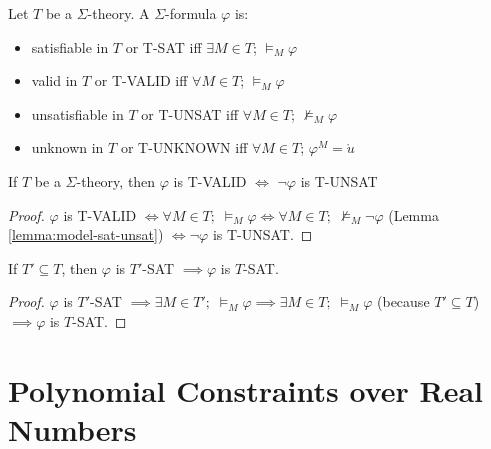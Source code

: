 \begin{definition}
Let $T$ be a $\Sigma$-theory. A $\Sigma$-formula $\varphi$ is:
\begin{itemize}
\item satisfiable in $T$ or T-SAT iff $\exists M \in T$; $\models_{M} \varphi$
\item valid in $T$ or T-VALID iff $\forall M \in T$; $\models_{M} \varphi$
\item unsatisfiable in $T$ or T-UNSAT iff $\forall M \in T$; $\not\models_{M} \varphi$
\item unknown in $T$ or T-UNKNOWN iff $\forall M \in T$; $\varphi^M = \mathring{u}$
\end{itemize}
\end{definition}

\begin{lemma} \label{lemma:theory-valid-unsat}
If $T$ be a $\Sigma$-theory, then $\varphi$ is T-VALID $\iff$ $\neg\varphi$ is T-UNSAT
\end{lemma}

\begin{proof}
$\varphi$ is T-VALID $\iff \forall M \in T; \; \models_{M} \varphi \iff \forall M \in T; \; \not\models_{M} \neg\varphi$ (Lemma \ref{lemma:model-sat-unsat}) $\iff \neg\varphi$ is T-UNSAT.
\end{proof}

\begin{lemma} \label{lemma:subtheory-SAT}
If $T' \subseteq T$, then $\varphi$ is $T'$-SAT $\implies \varphi$ is $T$-SAT.
\end{lemma}

\begin{proof}
$\varphi$ is $T'$-SAT $\implies \exists M \in T'; \; \models_M \varphi \implies \exists M \in T; \; \models_M \varphi$ (because $T' \subseteq T$) $\implies \varphi$ is $T$-SAT.
\end{proof}

\section{Polynomial Constraints over Real Numbers}
